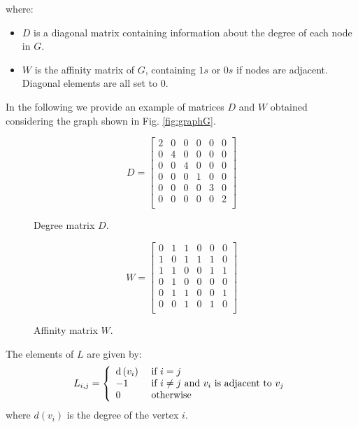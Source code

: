 where:
\begin{itemize}
	\item $D$ is a diagonal matrix containing information about the degree of each node in $G$.
	\item $W$ is the affinity matrix of $G$, containing $1s$ or $0s$ if nodes are adjacent. Diagonal elements are all set to $0$.
\end{itemize}
In the following we provide an example of matrices $D$ and $W$ obtained considering the graph shown in Fig. \ref{fig:graphG}.
\begin{figure}[H]
	\begin{minipage}[t]{0.49\linewidth} 
		\centering
		$$ D = \begin{bmatrix}
		2 & 0 & 0 & 0 & 0 & 0 \\
		0 & 4 & 0 & 0 & 0 & 0 \\
		0 & 0 & 4 & 0 & 0 & 0 \\
		0 & 0 & 0 & 1 & 0 & 0 \\
		0 & 0 & 0 & 0 & 3 & 0 \\
		0 & 0 & 0 & 0 & 0 & 2 \\
		\end{bmatrix}$$
		\caption{Degree matrix $D$.}
	\end{minipage}        
	\hspace{1cm}
	\begin{minipage}[t]{0.49\linewidth} 
		\centering
		$$ W = \begin{bmatrix}
		0 & 1 & 1 & 0 & 0 & 0 \\
		1 & 0 & 1 & 1 & 1 & 0 \\
		1 & 1 & 0 & 0 & 1 & 1 \\
		0 & 1 & 0 & 0 & 0 & 0 \\
		0 & 1 & 1 & 0 & 0 & 1 \\
		0 & 0 & 1 & 0 & 1 & 0 \\
		\end{bmatrix}$$
		\caption{Affinity matrix $W$.}
	\end{minipage}
\end{figure}

The elements of $L$ are given by:
$$
L _ { i , j } = \left\{ \begin{array} { l l } { \operatorname { d } \left( v _ { i } \right) } & { \text { if } i = j } \\ 
{ - 1 } & { \text { if } i \neq j \text { and } v _ { i } \text { is adjacent to } v _ { j } } \\ 
{ 0 } & { \text { otherwise } } \end{array} \right.
$$
where $d(v_i)$ is the degree of the vertex $i$.

